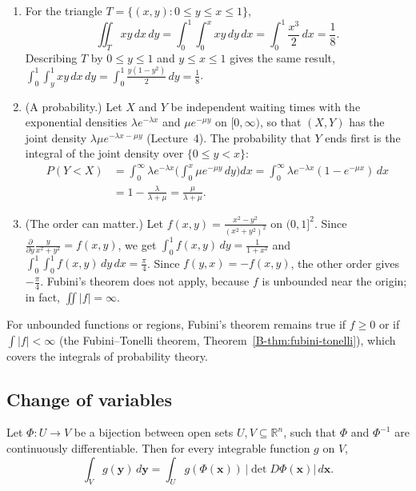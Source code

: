 \begin{example}\label{L3-ex:fubini}
    \begin{enumerate}
        \item For the triangle $T = \{(x, y) : 0 \leq y \leq x \leq 1\}$,
        \[\iint_T xy\, dx\, dy = \int_0^1 \int_0^x xy\, dy\, dx = \int_0^1 \frac{x^3}{2}\, dx = \frac{1}{8}.\]
        Describing $T$ by $0 \leq y \leq 1$ and $y \leq x \leq 1$ gives the same result, $\int_0^1 \int_y^1 xy\, dx\, dy = \int_0^1 \frac{y(1 - y^2)}{2}\, dy = \frac{1}{8}$.
        \item (A probability.) Let $X$ and $Y$ be independent waiting times with the exponential densities $\lambda e^{-\lambda x}$ and $\mu e^{-\mu y}$ on $[0, \infty)$, so that $(X, Y)$ has the joint density $\lambda\mu e^{-\lambda x - \mu y}$ (Lecture~4). The probability that $Y$ ends first is the integral of the joint density over $\{0 \leq y < x\}$:
        \begin{align*}
            P(Y < X) &= \int_0^\infty \lambda e^{-\lambda x}\bigg(\int_0^x \mu e^{-\mu y}\, dy\bigg) dx = \int_0^\infty \lambda e^{-\lambda x}(1 - e^{-\mu x})\, dx \\
            &= 1 - \frac{\lambda}{\lambda + \mu} = \frac{\mu}{\lambda + \mu}.
        \end{align*}
        \item (The order can matter.) Let $f(x, y) = \frac{x^2 - y^2}{(x^2 + y^2)^2}$ on $(0, 1]^2$. Since $\frac{\partial}{\partial y}\frac{y}{x^2 + y^2} = f(x, y)$, we get $\int_0^1 f(x, y)\, dy = \frac{1}{1 + x^2}$ and $\int_0^1\int_0^1 f(x, y)\, dy\, dx = \frac{\pi}{4}$. Since $f(y, x) = -f(x, y)$, the other order gives $-\frac{\pi}{4}$. Fubini's theorem does not apply, because $f$ is unbounded near the origin; in fact, $\iint |f| = \infty$.
    \end{enumerate}
\end{example}

For unbounded functions or regions, Fubini's theorem remains true if $f \geq 0$ or if $\int |f| < \infty$ (the Fubini--Tonelli theorem, Theorem~\ref{B-thm:fubini-tonelli}), which covers the integrals of probability theory.

\subsection{Change of variables}

\begin{theorem}\label{L3-thm:change-of-variables}
    Let $\Phi: U \to V$ be a bijection between open sets $U, V \subseteq \mathbb{R}^n$, such that $\Phi$ and $\Phi^{-1}$ are continuously differentiable. Then for every integrable function $g$ on $V$,
    \[\int_V g(\mathbf{y})\, d\mathbf{y} = \int_U g(\Phi(\mathbf{x}))\,|\det D\Phi(\mathbf{x})|\, d\mathbf{x}.\]
\end{theorem}

